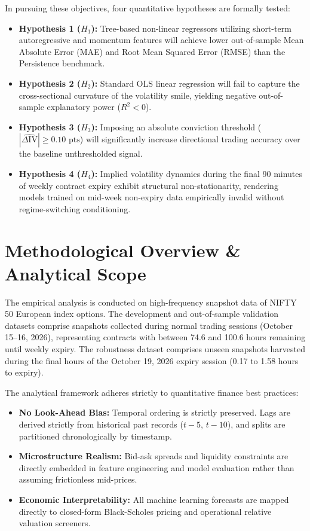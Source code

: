 In pursuing these objectives, four quantitative hypotheses are formally tested:
\begin{itemize}
    \item \textbf{Hypothesis 1 ($H_1$):} Tree-based non-linear regressors utilizing short-term autoregressive and momentum features will achieve lower out-of-sample Mean Absolute Error (MAE) and Root Mean Squared Error (RMSE) than the Persistence benchmark.
    \item \textbf{Hypothesis 2 ($H_2$):} Standard OLS linear regression will fail to capture the cross-sectional curvature of the volatility smile, yielding negative out-of-sample explanatory power ($R^2 < 0$).
    \item \textbf{Hypothesis 3 ($H_3$):} Imposing an absolute conviction threshold ($|\widehat{\Delta \text{IV}}| \ge 0.10\text{ pts}$) will significantly increase directional trading accuracy over the baseline unthresholded signal.
    \item \textbf{Hypothesis 4 ($H_4$):} Implied volatility dynamics during the final 90 minutes of weekly contract expiry exhibit structural non-stationarity, rendering models trained on mid-week non-expiry data empirically invalid without regime-switching conditioning.
\end{itemize}

\section{Methodological Overview \& Analytical Scope}
\label{sec:methodological_overview}

The empirical analysis is conducted on high-frequency snapshot data of NIFTY 50 European index options. The development and out-of-sample validation datasets comprise snapshots collected during normal trading sessions (October 15--16, 2026), representing contracts with between 74.6 and 100.6 hours remaining until weekly expiry. The robustness dataset comprises unseen snapshots harvested during the final hours of the October 19, 2026 expiry session (0.17 to 1.58 hours to expiry).

The analytical framework adheres strictly to quantitative finance best practices:
\begin{itemize}\setlength{\itemsep}{0pt}\setlength{\parskip}{0pt}
    \item \textbf{No Look-Ahead Bias:} Temporal ordering is strictly preserved. Lags are derived strictly from historical past records ($t-5$, $t-10$), and splits are partitioned chronologically by timestamp.
    \item \textbf{Microstructure Realism:} Bid-ask spreads and liquidity constraints are directly embedded in feature engineering and model evaluation rather than assuming frictionless mid-prices.
    \item \textbf{Economic Interpretability:} All machine learning forecasts are mapped directly to closed-form Black-Scholes pricing and operational relative valuation screeners.
\end{itemize}

